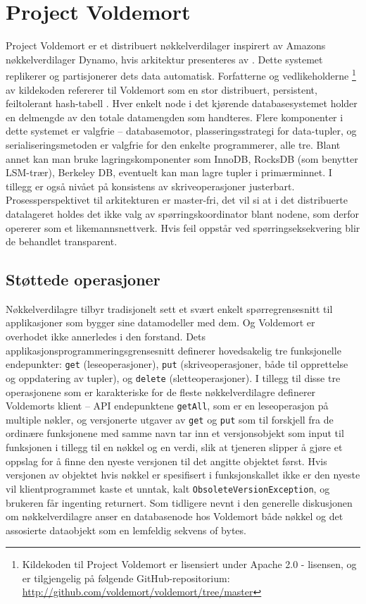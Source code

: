 \section{Project Voldemort}

Project Voldemort er et distribuert nøkkelverdilager inspirert av Amazons nøkkelverdilager Dynamo, hvis arkitektur presenteres av \cite{decandia2007}. Dette systemet replikerer og partisjonerer dets data automatisk. Forfatterne og vedlikeholderne \footnote{Kildekoden til Project Voldemort er lisensiert under Apache 2.0 - lisensen, og er tilgjengelig på følgende GitHub-repositorium: \url{http://github.com/voldemort/voldemort/tree/master}} av kildekoden refererer til Voldemort som en stor distribuert, persistent, feiltolerant hash-tabell \citep{kreps2009}. Hver enkelt node i det kjørende databasesystemet holder en delmengde av den totale datamengden som handteres. Flere komponenter i dette systemet er valgfrie – databasemotor, plasseringsstrategi for data-tupler, og serialiseringsmetoden er valgfrie for den enkelte programmerer, alle tre. Blant annet kan man bruke lagringskomponenter som InnoDB, RocksDB (som benytter LSM-trær), Berkeley DB, eventuelt kan man lagre tupler i primærminnet. I tillegg er også nivået på konsistens av skriveoperasjoner justerbart. Prosessperspektivet til arkitekturen er master-fri, det vil si at i det distribuerte datalageret holdes det ikke valg av spørringskoordinator blant nodene, som derfor opererer som et likemannsnettverk. Hvis feil oppstår ved spørringseksekvering blir de behandlet transparent.

\subsection{Støttede operasjoner}
Nøkkelverdilagre tilbyr tradisjonelt sett et svært enkelt spørregrensesnitt til applikasjoner som bygger sine datamodeller med dem. Og Voldemort er overhodet ikke annerledes i den forstand. Dets applikasjonsprogrammeringsgrensesnitt definerer hovedsakelig tre funksjonelle endepunkter: \texttt{get} (leseoperasjoner), \texttt{put} (skriveoperasjoner, både til opprettelse og oppdatering av tupler), og \texttt{delete} (sletteoperasjoner). I tillegg til disse tre operasjonene som er karakteriske for de fleste nøkkelverdilagre definerer Voldemorts klient – API endepunktene \texttt{getAll}, som er en leseoperasjon på multiple nøkler, og versjonerte utgaver av \texttt{get} og \texttt{put} som til forskjell fra de ordinære funksjonene med samme navn tar inn et versjonsobjekt som input til funksjonen i tillegg til en nøkkel og en verdi, slik at tjeneren slipper å gjøre et oppslag for å finne den nyeste versjonen til det angitte objektet først. Hvis versjonen av objektet hvis nøkkel er spesifisert i funksjonskallet ikke er den nyeste vil klientprogrammet kaste et unntak, kalt \texttt{ObsoleteVersionException}, og brukeren får ingenting returnert. Som tidligere nevnt i den generelle diskusjonen om nøkkelverdilagre anser en databasenode hos Voldemort både nøkkel og det assosierte dataobjekt som en lemfeldig sekvens of bytes.

